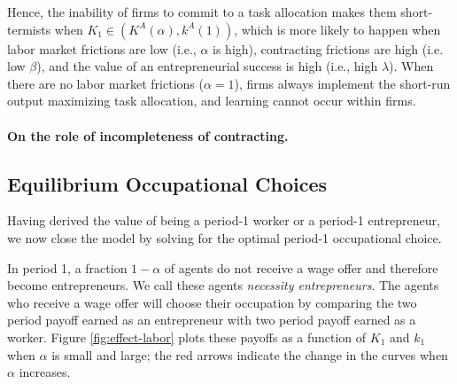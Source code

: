 \documentclass[12pt,american]{paper}
\theoremstyle{remark}
\begin{document}
 Hence, the inability of firms to commit to a task allocation makes them short-termists when $K_1\in(K^A(\alpha), k^A(1))$, which is more likely to happen when labor market frictions are low (i.e., $\alpha$ is high), contracting frictions are high (i.e. low $\beta$), and the value of an entrepreneurial success is high (i.e., high $\lambda$). When there are no labor market frictions ($\alpha=1$), firms always implement the short-run output maximizing task allocation, and learning cannot occur within firms.


\paragraph{On the role of incompleteness of contracting.} 
%
%
\subsection{Equilibrium Occupational Choices}

Having derived the value of being a period-1 worker or a period-1 entrepreneur, we now close the model by solving for the optimal period-1 occupational choice.

 In period 1, a fraction  $1-\alpha$ of agents do not receive a wage offer and therefore become entrepreneurs. We call these agents \textit{necessity entrepreneurs}. The agents who receive a wage offer will choose their occupation by comparing the two period payoff earned as an entrepreneur with two period payoff earned as a worker. Figure \ref{fig:effect-labor} plots these payoffs as a function of $K_1$ and $k_1$ when $\alpha$ is small and large; the red arrows indicate the change in the curves when $\alpha$ increases.
 
\end{document}
